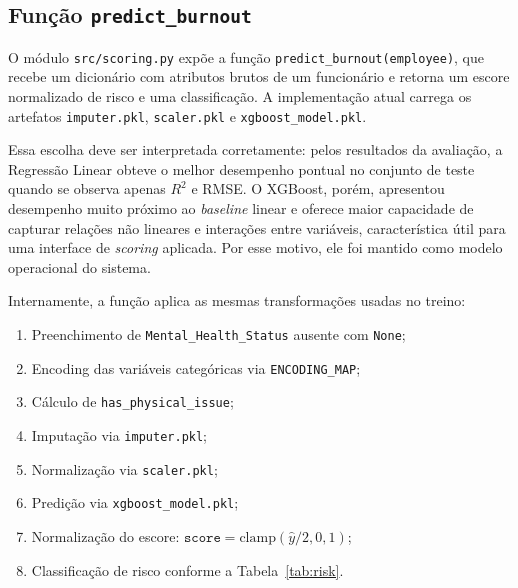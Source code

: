 \documentclass[conference]{IEEEtran}
\begin{document}
\subsection{Função \texttt{predict_burnout}}

O módulo \texttt{src/scoring.py} expõe a função
\texttt{predict_burnout(employee)}, que recebe um dicionário com atributos
brutos de um funcionário e retorna um escore normalizado de risco e uma
classificação. A implementação atual carrega os artefatos
\texttt{imputer.pkl}, \texttt{scaler.pkl} e \texttt{xgboost_model.pkl}.

Essa escolha deve ser interpretada corretamente: pelos resultados da
avaliação, a Regressão Linear obteve o melhor desempenho pontual no conjunto
de teste quando se observa apenas $R^2$ e RMSE. O XGBoost, porém, apresentou
desempenho muito próximo ao \textit{baseline} linear e oferece maior
capacidade de capturar relações não lineares e interações entre variáveis,
característica útil para uma interface de \textit{scoring} aplicada. Por
esse motivo, ele foi mantido como modelo operacional do sistema.

Internamente, a função aplica as mesmas transformações usadas no treino:

\begin{enumerate}
\item Preenchimento de \texttt{Mental_Health_Status} ausente com \texttt{None};
\item Encoding das variáveis categóricas via \texttt{ENCODING_MAP};
\item Cálculo de \texttt{has_physical_issue};
\item Imputação via \texttt{imputer.pkl};
\item Normalização via \texttt{scaler.pkl};
\item Predição via \texttt{xgboost_model.pkl};
\item Normalização do escore:
$\texttt{score} = \text{clamp}(\hat{y}/2, 0, 1)$;
\item Classificação de risco conforme a Tabela~\ref{tab:risk}.
\end{enumerate}
\end{document}
